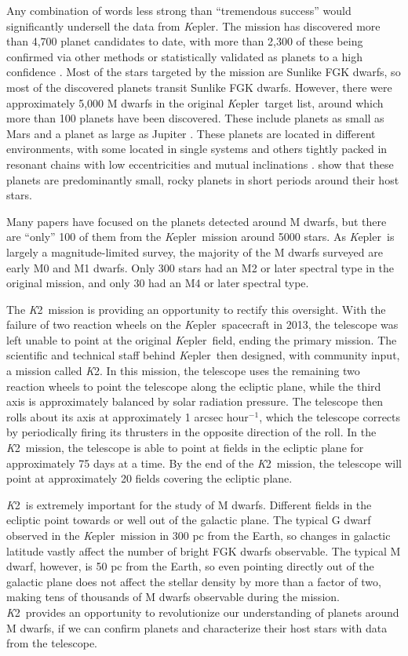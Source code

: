 \documentclass[12pt]{caltech_thesis}
\newcommand{\kep}{{\textit Kepler}}
\newcommand{\KT}{{\textit K2}}
\begin{document}
Any combination of words less strong than ``tremendous success'' would significantly undersell the data from \kep.
The mission has discovered more than 4,700 planet candidates to date, with more than 
2,300 of these being confirmed via other methods or statistically validated as planets
to a high confidence \citep{Batalha13, Burke14, Mullally15, Rowe15, Morton16}.
Most of the stars targeted by the mission are Sunlike FGK dwarfs, so most of the discovered
planets transit Sunlike FGK dwarfs.
However, there were approximately 5,000 M dwarfs in the original \kep\ target list, around
which more than 100 planets have been discovered.
These include planets as small as Mars \citep{KOI961} and a planet as large as Jupiter
\citep{Johnson11c}.
These planets are located in different environments, with some located in single systems
and others tightly packed in resonant chains with low eccentricities and mutual inclinations
\citep{Swift13, Ballard16}.
\citet{Morton14} show that these planets are predominantly small, rocky planets in short
periods around their host stars.

Many papers have focused on the planets detected around M dwarfs, but there are ``only'' 100
of them from the \kep\ mission around 5000 stars. As \kep\ is largely a magnitude-limited
survey, the majority of the M dwarfs surveyed are early M0 and M1 dwarfs. 
Only 300 stars had an M2 or later spectral type in the original mission, and only 30 had
an M4 or later spectral type.

The \KT\ mission is providing an opportunity to rectify this oversight.
With the failure of two reaction wheels on the \kep\ spacecraft in 2013, the telescope
was left unable to point at the original \kep\ field, ending the primary mission.
The scientific and technical staff behind \kep\ then designed, with community input,
a mission called \KT. 
In this mission, the telescope uses the remaining two reaction wheels to point the telescope
along the ecliptic plane, while the third axis is approximately balanced by solar radiation
pressure.
The telescope then rolls about its axis at approximately 1 arcsec hour$^{-1}$, which 
the telescope corrects by periodically firing its thrusters in the opposite direction
of the roll.
In the \KT\ mission, the telescope is able to point at fields in the ecliptic plane for
approximately 75 days at a time.
By the end of the \KT\ mission, the telescope will point at approximately 20 fields
covering the ecliptic plane.

\KT\ is extremely important for the study of M dwarfs.
Different fields in the ecliptic point towards or well out of the galactic plane.
The typical G dwarf observed in the \kep\ mission in 300 pc from the Earth, so changes
in galactic latitude vastly affect the number of bright FGK dwarfs observable.
The typical M dwarf, however, is 50 pc from the Earth, so even pointing directly out of the
galactic plane does not affect the stellar density by more than a factor of two, making 
tens of thousands of M dwarfs observable during the mission. 
\KT\ provides an opportunity to revolutionize our understanding of planets around M dwarfs,
if we can confirm planets and characterize their host stars with data from the telescope.
\end{document}
